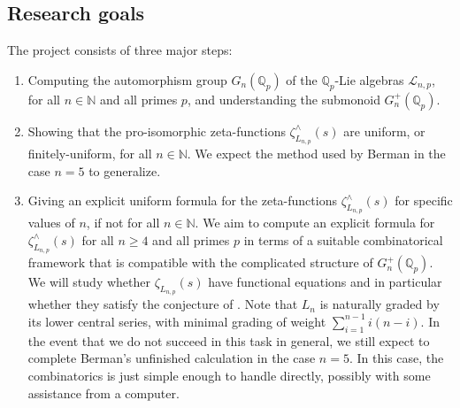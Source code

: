 \documentclass[12pt]{article}
\begin{document}
\subsection{Research goals}
The project consists of three major steps:
\begin{enumerate}
\item
Computing the automorphism group $G_{n}(\mathbb{Q}_{p})$ of the $\mathbb{Q}_p$-Lie algebras $\mathcal{L}_{n,p}$, for all $n\in\mathbb{N}$ and all primes $p$, and understanding the submonoid $G_{n}^{+}(\mathbb{Q}_{p})$.
\item
Showing that the pro-isomorphic zeta-functions $\zeta_{L_{n,p}}^{\wedge}(s)$ are uniform, or finitely-uniform, for all $n\in\mathbb{N}$. We expect the method used by Berman in the case $n=5$ to generalize.
\item
Giving an explicit uniform formula for the zeta-functions $\zeta_{L_{n,p}}^{\wedge}(s)$ for specific values of $n$, if not for all $n\in\mathbb{N}$.
We aim to compute an explicit formula for $\zeta_{L_{n,p}}^{\wedge}(s)$ for all $n \geq 4$ and all primes $p$ in terms of a suitable combinatorical framework that is compatible with the complicated structure of $G_{n}^{+}(\mathbb{Q}_p)$. We will study whether $\zeta_{L_{n,p}}(s)$ have functional equations and in particular whether they satisfy the conjecture of \cite{BermanKlopschOnn}. Note that $L_{n}$ is naturally graded by its lower central series, with minimal grading of weight $\sum_{i=1}^{n-1}{i(n-i)}$. In the event that we do not succeed in this task in general, we still expect to complete Berman's unfinished calculation in the case $n=5$. In this case, the combinatorics is just simple enough to handle directly, possibly with some assistance from a computer.
\end{enumerate}
\end{document}
